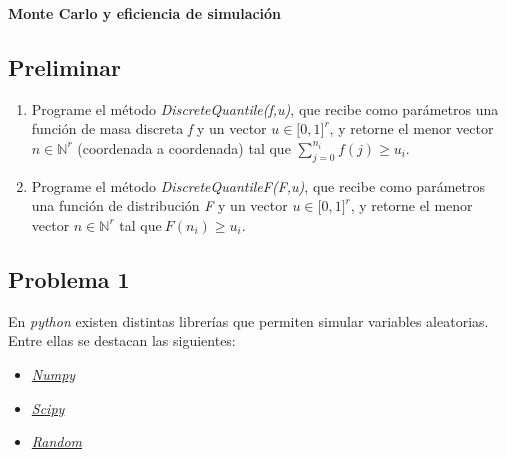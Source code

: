 \vspace{0.3cm}
\begin{center}
{\huge \textbf{Monte Carlo y eficiencia de simulación}}
\end{center}


\subsection*{Preliminar}
\begin{enumerate}
  \item Programe el m\'{e}todo \emph{DiscreteQuantile(f,u)}, que recibe como par\'{a}metros una funci\'{o}n de masa discreta \emph{f} y un vector $u\in \lbrack 0,1]^{r}$, y retorne el menor vector $n\in\mathbb{N}^r$ (coordenada a coordenada) tal que $\sum_{j=0}^{n_i}f(j)\geq u_i.$

  \item Programe el m\'{e}todo \emph{DiscreteQuantileF(F,u)}, que recibe como par\'{a}metros una funci\'{o}n de distribuci\'{o}n \emph{F} y un vector $u\in \lbrack 0,1]^{r}$, y retorne el menor vector $n\in\mathbb{N}^r$ tal que$\ F(n_i)\geq u_i.$
\end{enumerate}

\subsection*{Problema 1}

En \textit{python} existen distintas librerías que permiten simular variables aleatorias. Entre ellas se destacan las siguientes:
\begin{multicols}{3}
\begin{itemize}
    \item \href{https://numpy.org/doc/}{\textit{Numpy}}
    \item \href{https://docs.scipy.org/doc/scipy/}{\textit{Scipy}}
    \item \href{https://docs.python.org/3/library/random.html}{\textit{Random}}
\end{itemize}
\end{multicols}

